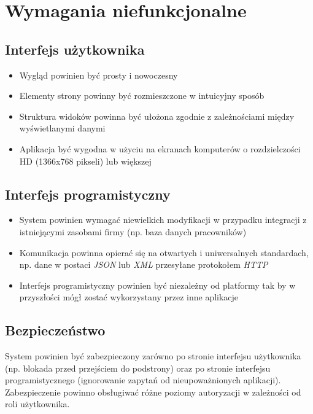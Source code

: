 \documentclass[eng,printmode,openany]{mgr}
\begin{document}
	\section{Wymagania niefunkcjonalne}
	\subsection{Interfejs użytkownika}
	\begin{itemize}
		\item Wygląd powinien być prosty i nowoczesny
		\item Elementy strony powinny być rozmieszczone w intuicyjny sposób
		\item Struktura widoków powinna być ułożona zgodnie z zależnościami między wyświetlanymi danymi
		\item Aplikacja być wygodna w użyciu na ekranach komputerów o rozdzielczości HD (1366x768 pikseli) lub większej
	\end{itemize}
	\subsection{Interfejs programistyczny}
	\begin{itemize}
		\item System powinien wymagać niewielkich modyfikacji w przypadku integracji z istniejącymi zasobami firmy (np. baza danych pracowników)
		\item Komunikacja powinna opierać się na otwartych i uniwersalnych standardach, np. dane w postaci \textit{JSON} lub \textit{XML} przesyłane protokołem \textit{HTTP}
		\item Interfejs programistyczny powinien być niezależny od platformy tak by w przyszłości mógł zostać wykorzystany przez inne aplikacje
	\end{itemize}
	\subsection{Bezpieczeństwo}
	System powinien być zabezpieczony zarówno po stronie interfejsu użytkownika (np. blokada przed przejściem do podstrony) oraz po stronie interfejsu programistycznego (ignorowanie zapytań od nieupoważnionych aplikacji). Zabezpieczenie powinno obsługiwać różne poziomy autoryzacji w zależności od roli użytkownika.
	
	\newpage
\end{document}
